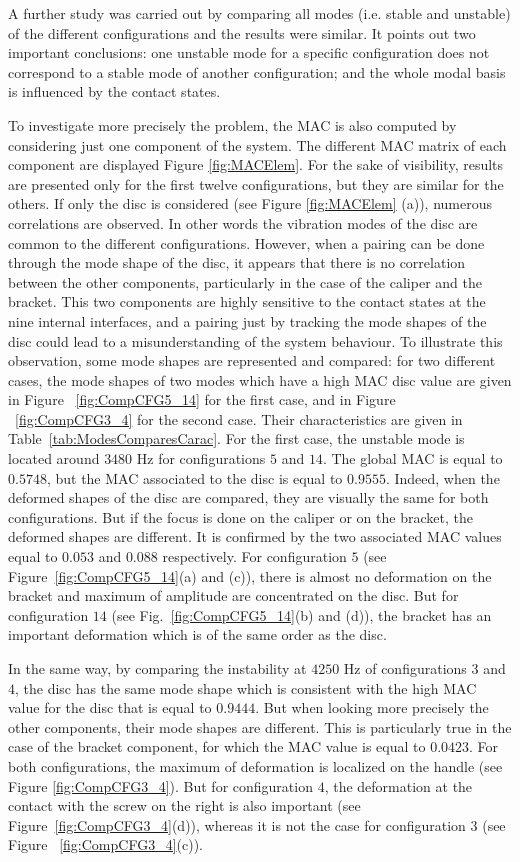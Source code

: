 \documentclass[final,1p]{elsarticle}
\begin{document}
A further study was carried out by comparing all modes (i.e. stable and unstable) of the different configurations and the results were similar. It points out two important conclusions: one unstable mode for a specific configuration does not correspond to a stable mode of another configuration; and the whole modal basis is influenced by the contact states. 


To investigate more precisely the problem, the MAC is also computed by considering just one component of the system. The different MAC matrix of each component are displayed Figure \ref{fig:MACElem}. For the sake of visibility, results are presented only for the first twelve configurations, but they are similar for the others. If only the disc is considered (see Figure \ref{fig:MACElem} (a)), numerous correlations are observed. In other words the vibration modes of the disc are common to the different configurations. However, when a pairing can be done through the mode shape of the disc, it appears that there is no correlation between the other components, particularly in the case of the caliper and the bracket. This two components are highly sensitive to the contact states at the nine internal interfaces, and a pairing just by tracking the mode shapes of the disc could lead to a misunderstanding of the system behaviour. To illustrate this observation, some mode shapes are represented and compared: for two different cases, the mode shapes of two modes which have a high MAC disc value are given in Figure ~\ref{fig:CompCFG5_14} for the first case, and in Figure ~\ref{fig:CompCFG3_4} for the second case. Their characteristics are given in Table~\ref{tab:ModesComparesCarac}. For the first case, the unstable mode is located around $3480$ Hz for configurations $5$ and $14$. The global MAC is equal to $0.5748$, but the MAC associated to the disc is equal to $0.9555$. Indeed, when the deformed shapes of the disc are compared, they are visually the same for both configurations. But if the focus is done on the caliper or on the bracket, the deformed shapes are different. It is confirmed by the two associated MAC values equal to $0.053$ and $0.088$ respectively. For configuration $5$ (see Figure~\ref{fig:CompCFG5_14}(a) and (c)), there is almost no deformation on the bracket and maximum of amplitude are concentrated on the disc. But for configuration $14$ (see Fig.~\ref{fig:CompCFG5_14}(b) and (d)), the bracket has an important deformation which is of the same order as the disc.

In the same way, by comparing the instability at $4250$ Hz of configurations $3$ and $4$, the disc has the same mode shape which is consistent with the high MAC value for the disc that is equal to $0.9444$. But when looking more precisely the other components, their mode shapes are different. This is particularly true in the case of the bracket component, for which the MAC value is equal to $0.0423$.  For both configurations, the maximum of deformation is localized on the handle (see Figure \ref{fig:CompCFG3_4}). But for configuration $4$, the deformation at the contact with the screw on the right is also important (see Figure~\ref{fig:CompCFG3_4}(d)), whereas it is not the case for configuration $3$ (see Figure ~\ref{fig:CompCFG3_4}(c)). 
\end{document}
